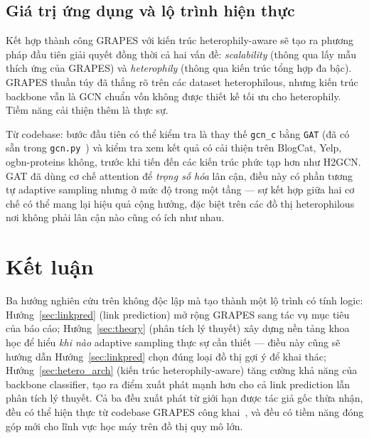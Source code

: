 \subsection{Giá trị ứng dụng và lộ trình hiện thực}

Kết hợp thành công GRAPES với kiến trúc heterophily-aware sẽ tạo ra phương pháp đầu tiên giải quyết đồng thời cả hai vấn đề: \textit{scalability} (thông qua lấy mẫu thích ứng của GRAPES) và \textit{heterophily} (thông qua kiến trúc tổng hợp đa bậc). GRAPES thuần túy đã thắng rõ trên các dataset heterophilous, nhưng kiến trúc backbone vẫn là GCN chuẩn vốn không được thiết kế tối ưu cho heterophily. Tiềm năng cải thiện thêm là thực sự.

Từ codebase: bước đầu tiên có thể kiểm tra là thay thế \texttt{gcn\_c} bằng \texttt{GAT} (đã có sẵn trong \texttt{gcn.py}~\cite{Velickovic2018}) và kiểm tra xem kết quả có cải thiện trên BlogCat, Yelp, ogbn-proteins không, trước khi tiến đến các kiến trúc phức tạp hơn như H2GCN. GAT đã dùng cơ chế attention để \textit{trọng số hóa} lân cận, điều này có phần tương tự adaptive sampling nhưng ở mức độ trong một tầng --- sự kết hợp giữa hai cơ chế có thể mang lại hiệu quả cộng hưởng, đặc biệt trên các đồ thị heterophilous nơi không phải lân cận nào cũng có ích như nhau.

\section{Kết luận}

Ba hướng nghiên cứu trên không độc lập mà tạo thành một lộ trình có tính logic: Hướng~\ref{sec:linkpred} (link prediction) mở rộng GRAPES sang tác vụ mục tiêu của báo cáo; Hướng~\ref{sec:theory} (phân tích lý thuyết) xây dựng nền tảng khoa học để hiểu \textit{khi nào} adaptive sampling thực sự cần thiết --- điều này cũng sẽ hướng dẫn Hướng~\ref{sec:linkpred} chọn đúng loại đồ thị gợi ý để khai thác; Hướng~\ref{sec:hetero_arch} (kiến trúc heterophily-aware) tăng cường khả năng của backbone classifier, tạo ra điểm xuất phát mạnh hơn cho cả link prediction lẫn phân tích lý thuyết. Cả ba đều xuất phát từ giới hạn được tác giả gốc thừa nhận, đều có thể hiện thực từ codebase GRAPES công khai~\cite{Younesian2023GRAPES}, và đều có tiềm năng đóng góp mới cho lĩnh vực học máy trên đồ thị quy mô lớn.
